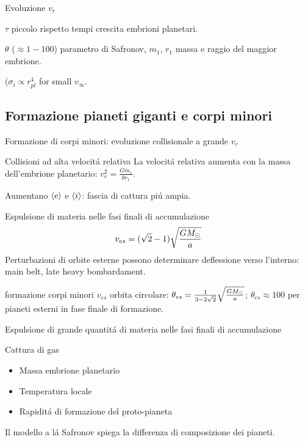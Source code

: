\begin{wordonframe}{Evoluzione $v_r$}

$\tau$ piccolo rispetto tempi crescita embrioni planetari.

$\theta$ ($\approx1-100$) parametro di Safronov, $m_1$, $r_1$ massa e raggio del maggior embrione.

($\sigma_i\propto r_{pl}^4$ for small $v_{\infty}$.

\end{wordonframe}

\subsection{Formazione pianeti giganti e corpi minori}

\begin{frame}{Formazione di corpi minori: evoluzione collisionale a grande $v_r$}
\begin{block}{Collisioni ad alta velocit\'a relativa}
La velocit\'a relativa aumenta con la massa dell'embrione planetario: $v_r^2=\frac{Gm_1}{\theta r_1}$.

Aumentano $\langle e \rangle$ e $\langle i \rangle$: fascia di cattura pi\'u ampia.
\end{block}
\begin{block}{Espulsione di materia nelle fasi finali di accumulazione}
\begin{equation*}
v_{es}=(\sqrt{2}-1)\sqrt{\frac{GM_{\odot}{}}{a}}
\end{equation*}
Perturbazioni di orbite esterne possono determinare deflessione verso l'interno: main belt, late heavy bombardament.
\end{block}

\end{frame}

\begin{wordonframe}{formazione corpi minori}
$v_{es}$ orbita circolare: $\theta_{es}=\frac{1}{3-2\sqrt{2}}\sqrt{\frac{GM_{\odot}{}}{a}}$; $\theta_{es}\approx100$ per pianeti esterni in fase finale di formazione.

Espulsione di grande quantit\'a di materia nelle fasi finali di accumulazione
\end{wordonframe}

\begin{frame}{Cattura di gas}
\begin{itemize}
\item Massa embrione planetario
\item Temperatura locale
\item Rapidit\'a di formazione del proto-pianeta
\end{itemize}
Il modello a l\'a Safronov spiega la differenza di composizione dei pianeti.
\end{frame}

